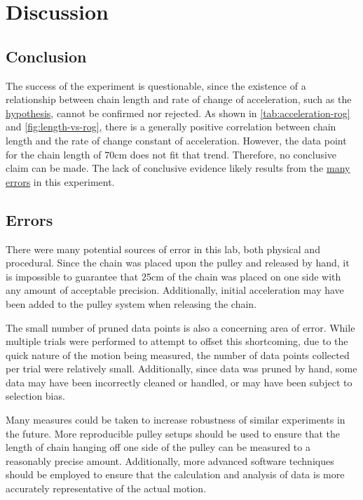 \documentclass[stu,biblatex,floatsintext]{apa7}
\begin{document}
\section{Discussion}

\subsection{Conclusion}
The success of the experiment is questionable, since the existence of a relationship between chain length and rate of change of acceleration, such as the \hyperref[sec:hypothesis]{hypothesis}, cannot be confirmed nor rejected. As shown in \autoref{tab:acceleration-rog} and \autoref{fig:length-vs-rog}, there is a generally positive correlation between chain length and the rate of change constant of acceleration. However, the data point for the chain length of 70\unit{\centi\meter} does not fit that trend. Therefore, no conclusive claim can be made. The lack of conclusive evidence likely results from the \hyperref[sec:errors]{many errors} in this experiment.

\subsection{Errors}\label{sec:errors}
There were many potential sources of error in this lab, both physical and procedural. Since the chain was placed upon the pulley and released by hand, it is impossible to guarantee that 25\unit{\centi\meter} of the chain was placed on one side with any amount of acceptable precision. Additionally, initial acceleration may have been added to the pulley system when releasing the chain.

The small number of pruned data points is also a concerning area of error. While multiple trials were performed to attempt to offset this shortcoming, due to the quick nature of the motion being measured, the number of data points collected per trial were relatively small. Additionally, since data was pruned by hand, some data may have been incorrectly cleaned or handled, or may have been subject to selection bias.

Many measures could be taken to increase robustness of similar experiments in the future. More reproducible pulley setups should be used to ensure that the length of chain hanging off one side of the pulley can be measured to a reasonably precise amount. Additionally, more advanced software techniques should be employed to ensure that the calculation and analysis of data is more accurately representative of the actual motion.
\end{document}
